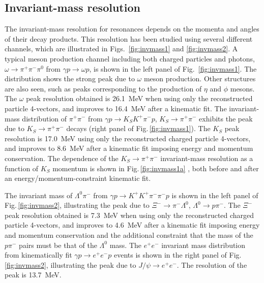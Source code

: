 \subsection{Invariant-mass resolution \label{sec:perfchargedresol}}

The invariant-mass resolution for resonances depends on the momenta and angles of their decay products.  This resolution has been studied using several different channels, which are illustrated in Figs.~\ref{fig:invmass1} and \ref{fig:invmass2}. A typical meson production channel including both charged particles and photons, $\omega \to \pi^+\pi^-\pi^0$ from $\gamma p \to \omega p$, is shown in the left panel of Fig.~\ref{fig:invmass1}. The distribution shows the strong peak due to $\omega$ meson production.  Other structures are also seen, such as peaks corresponding to the production of $\eta$ and $\phi$ mesons.  The $\omega$ peak resolution obtained is 26.1~MeV when using only the reconstructed  particle 4-vectors, and improves to 16.4~MeV after a kinematic fit. The invariant-mass distribution of $\pi^+\pi^-$ from $\gamma p \to K_S K^+ \pi^- p$, $K_S\to\pi^+\pi^-$ exhibits the peak due to $K_S\to\pi^+\pi^-$ decays (right panel of Fig.\,\ref{fig:invmass1}).  The $K_S$ peak resolution is 17.0~MeV using only the reconstructed charged particle 4-vectors, and improves to  8.6~MeV after a kinematic fit imposing energy and momentum conservation. The dependence of the $K_S\to\pi^+\pi^-$ invariant-mass resolution as a function of $K_S$ momentum is shown in Fig.\,\ref{fig:invmass1a} , both before and after an energy/momentum-constraint kinematic fit.  

The invariant mass of $\Lambda^0\pi^-$ from $\gamma p \to K^+ K^+ \pi^- \pi^- p$ is shown in the left panel of Fig.\,\ref{fig:invmass2},  illustrating the peak due to $\Xi^- \to \pi^- \Lambda^0$, $\Lambda^0 \to p \pi^-$.  The $\Xi^-$ peak resolution obtained is 7.3~MeV when using only the reconstructed charged particle 4-vectors, and improves to 4.6~MeV after a kinematic fit imposing energy and momentum conservation and the additional constraint that the mass of the $p \pi^-$ pairs must be that of the $\Lambda^0$ mass.  The $e^+e^-$ invariant mass distribution from kinematically fit $\gamma p \to e^+e^- p$ events is shown in the right panel of Fig.\,\ref{fig:invmass2}, illustrating the peak due to $J/\psi\to e^+e^-$.  The resolution of the peak is 13.7~MeV.            
 
